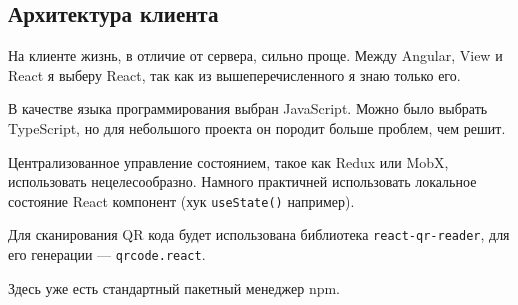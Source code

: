 \subsection{Архитектура клиента}
На клиенте жизнь, в отличие от сервера, сильно проще.
Между Angular, View и React я выберу React, так как из вышеперечисленного я знаю только его.

В качестве языка программирования выбран JavaScript.
Можно было выбрать TypeScript, но для небольшого проекта он породит больше проблем, чем решит.

Централизованное управление состоянием, такое как Redux или MobX, использовать нецелесообразно.
Намного практичней использовать локальное состояние React компонент (хук \texttt{useState()} например).

Для сканирования QR кода будет использована библиотека \texttt{react-qr-reader}, для его генерации --- \texttt{qrcode.react}.

Здесь уже есть стандартный пакетный менеджер npm.